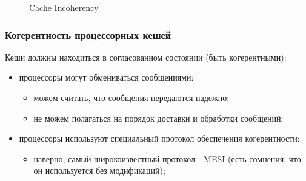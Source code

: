 \begin{frame}
\begin{figure}
  \caption{Cache Incoherency}
\end{figure}
\end{frame}

\begin{frame}
\frametitle{Когерентность процессорных кешей}

Кеши должны находиться в согласованном состоянии (быть когерентными):
\begin{itemize}
  \item процессоры могут обмениваться сообщениями:
        \begin{itemize}
          \item можем считать, что сообщения передаются надежно;
          \item не можем полагаться на порядок доставки и обработки сообщений;
        \end{itemize}
  \item процессоры используют специальный протокол обеспечения когерентности:
        \begin{itemize}
          \item наверно, самый широкоизвестный протокол - MESI (есть сомнения,
                что он используется без модификаций);
        \end{itemize}
\end{itemize}
\end{frame}
